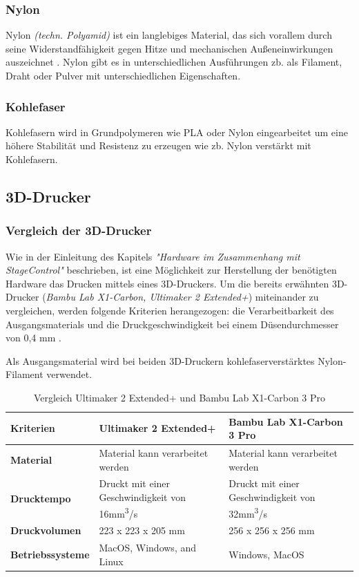 \subsubsection{Nylon}
Nylon \emph{(techn. Polyamid)} ist ein langlebiges Material, das sich vorallem durch seine Widerstandfähigkeit gegen Hitze und mechanischen Außeneinwirkungen auszeichnet \textcite{Nylon}. Nylon gibt es in unterschiedlichen Ausführungen zb. als Filament, Draht oder Pulver mit unterschiedlichen Eigenschaften. 
\subsubsection{Kohlefaser}
Kohlefasern wird in Grundpolymeren wie PLA oder Nylon eingearbeitet \textcite{Kohlefasern} um eine höhere Stabilität und Resistenz zu erzeugen wie zb. Nylon verstärkt mit Kohlefasern.\\
 


\subsection{3D-Drucker}

\subsubsection{Vergleich der 3D-Drucker}
Wie in der Einleitung des Kapitels \emph{"Hardware im Zusammenhang mit StageControl"} beschrieben, ist eine Möglichkeit zur Herstellung der benötigten Hardware das Drucken mittels eines 3D-Druckers. Um die bereits erwähnten 3D-Drucker (\emph{Bambu Lab X1-Carbon, Ultimaker 2 Extended+})  \textcite{Ultimaker2ExtendedSpecification} miteinander zu vergleichen, werden folgende Kriterien herangezogen: die Verarbeitbarkeit des Ausgangsmaterials und die Druckgeschwindigkeit bei einem Düsendurchmesser von 0,4 mm \textcite{BambuLabX1Carbon3DPrinterSpecifications}. 

Als Ausgangsmaterial wird bei beiden 3D-Druckern kohlefaserverstärktes Nylon-Filament verwendet.

\begin{table} [H]
	\begin{tabular}{ |p{2.7cm} |p{4.8cm}|p{4.8cm}| }
		\hline
		 \textbf{Kriterien} & \textbf{Ultimaker 2 Extended+}& \textbf{Bambu Lab X1-Carbon 3 Pro}\\
		\hline
		\textbf{Material} & Material kann verarbeitet werden & Material kann verarbeitet werden   \\ 
		\hline
		\textbf{Drucktempo} & Druckt mit einer Geschwindigkeit von 16mm\textsuperscript{3}/s &
		 Druckt mit einer Geschwindigkeit von 32mm\textsuperscript{3}/s   \\  
		\hline
		\textbf{Druckvolumen} & 223 x 223 x 205 mm & 256 x 256 x 256 mm \\
		\hline
		\textbf{Betriebssysteme} & MacOS, Windows, and Linux & Windows, MacOS \\
		\hline
	\end{tabular}
	\caption{Vergleich  Ultimaker 2 Extended+ und Bambu Lab X1-Carbon 3 Pro}
\end{table}


